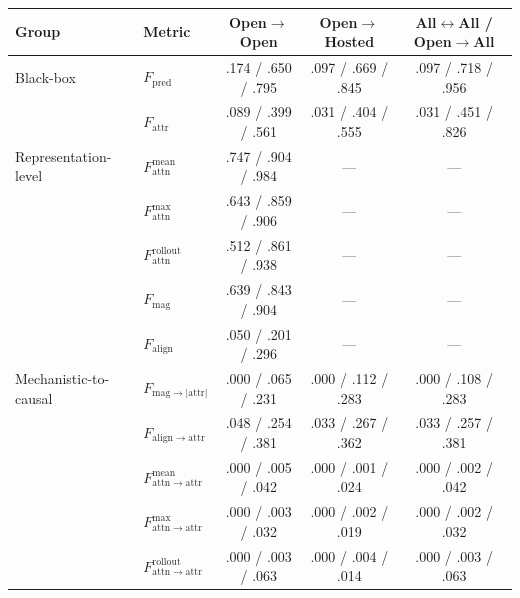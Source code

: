 \begin{tabular}{llccc}
\toprule
Group & Metric & Open$\to$Open & Open$\to$Hosted & All$\leftrightarrow$All / Open$\to$All \\
\midrule
Black-box & $F_{\mathrm{pred}}$ & .174 / .650 / .795 & .097 / .669 / .845 & .097 / .718 / .956 \\
 & $F_{\mathrm{attr}}$ & .089 / .399 / .561 & .031 / .404 / .555 & .031 / .451 / .826 \\
\midrule
Representation-level & $F_{\mathrm{attn}}^{\mathrm{mean}}$ & .747 / .904 / .984 & --- & --- \\
 & $F_{\mathrm{attn}}^{\mathrm{max}}$ & .643 / .859 / .906 & --- & --- \\
 & $F_{\mathrm{attn}}^{\mathrm{rollout}}$ & .512 / .861 / .938 & --- & --- \\
 & $F_{\mathrm{mag}}$ & .639 / .843 / .904 & --- & --- \\
 & $F_{\mathrm{align}}$ & .050 / .201 / .296 & --- & --- \\
\midrule
Mechanistic-to-causal & $F_{\mathrm{mag}\to|\mathrm{attr}|}$ & .000 / .065 / .231 & .000 / .112 / .283 & .000 / .108 / .283 \\
 & $F_{\mathrm{align}\to\mathrm{attr}}$ & .048 / .254 / .381 & .033 / .267 / .362 & .033 / .257 / .381 \\
 & $F_{\mathrm{attn}\to\mathrm{attr}}^{\mathrm{mean}}$ & .000 / .005 / .042 & .000 / .001 / .024 & .000 / .002 / .042 \\
 & $F_{\mathrm{attn}\to\mathrm{attr}}^{\mathrm{max}}$ & .000 / .003 / .032 & .000 / .002 / .019 & .000 / .002 / .032 \\
 & $F_{\mathrm{attn}\to\mathrm{attr}}^{\mathrm{rollout}}$ & .000 / .003 / .063 & .000 / .004 / .014 & .000 / .003 / .063 \\
\bottomrule
\end{tabular}
